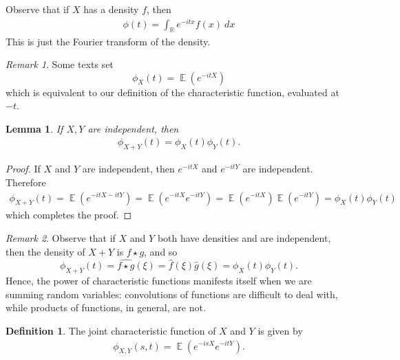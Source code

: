 \documentclass[12pt]{article}
\newcommand{\rr}{\mathbb{R}}
\newcommand{\wh}{\widehat}
\DeclareMathOperator{\ex}{\mathbb{E}}
\theoremstyle{plain}
\newtheorem{lemma}[theorem]{Lemma}
\theoremstyle{definition}
\newtheorem*{definition}{Definition}
\theoremstyle{remark}
\newtheorem*{remark}{Remark}
\numberwithin{equation}{section}  %
\begin{document}
Observe that if $X$ has a density $f$, then
\begin{equation*}
	\begin{split}
		\phi(t) = \int_{\rr} e^{-itx} f(x) \ dx
	\end{split}
\end{equation*}
This is just the Fourier transform of the density. 
\begin{framed}
	\begin{remark}
		Some texts set
		\[\phi_{X}(t) = \ex(e^{-itX})\]
		which is equivalent to our definition
		of the characteristic function, evaluated at $-t$. 
	\end{remark}
\end{framed}
\begin{lemma}\label{lem:indep}
	If $X, Y$ are independent, then
	\begin{equation*}
		\begin{split}
			\phi_{X + Y}(t) = \phi_{X}(t) \phi_{Y}(t).
		\end{split}
	\end{equation*}
\end{lemma}
\begin{proof}
	If $X$ and $Y$ are independent, then $e^{-itX}$ and $e^{-itY}$ are independent.
	Therefore
	\begin{equation*}
		\begin{split}
			\phi_{X + Y}(t) = \ex(e^{-itX - itY}) = \ex(e^{-itX} e^{-itY})
			= \ex(e^{-itX}) \ex (e^{-itY}) = \phi_{X}(t) \phi_{Y}(t)
		\end{split}
	\end{equation*}
	which completes the proof.
\end{proof}
\begin{framed}
	\begin{remark}
		Observe that if $X$ and $Y$ both have densities and are independent, then 
		the density of $X + Y$ is $f \star g$, and so 
		\[\phi_{X + Y}(t) = \wh{f \star g}(\xi) = \wh{f}(\xi) \wh{g}(\xi) =
		\phi_{X}(t) \phi_{Y}(t).\]
		Hence, the power of characteristic functions manifests itself when
		we are summing random variables: convolutions of functions are difficult to deal
		with, while products of functions, in general, are not. 
	\end{remark}
\end{framed}
\begin{definition}
	The joint characteristic function of $X$ and $Y$ is given by
	\begin{equation*}
		\begin{split}
			\phi_{X,Y}(s,t) = \ex(e^{-isX} e^{-itY}).
		\end{split}
	\end{equation*}
\end{definition}
\end{document}
